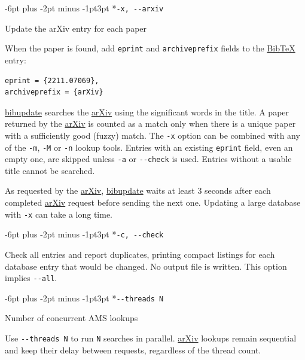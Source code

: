 \documentclass{amsart}
\makeatletter
\newcommand{\BibUpdateOptionHeading}{\@startsection{paragraph}{4}{0pt}
  {-6pt plus -2pt minus -1pt}{3pt}
  {\normalfont\bfseries\color{NavyBlue}}}
\newenvironment{BibUpdateOptionDescription}
  {\begin{list}{}{\setlength{\leftmargin}{2em}\setlength{\rightmargin}{0pt}%
    \setlength{\listparindent}{0pt}%
    \setlength{\topsep}{0pt}\setlength{\parsep}{4pt plus 1pt}%
    \setlength{\itemsep}{0pt}}\item\relax}
  {\end{list}}
\makeatother
\begin{document}
\BibUpdateOptionHeading*{\texorpdfstring{\texttt{-x,\ -\/-arxiv}}{-x, -\/-arxiv}}\label{-x---arxiv}

\begin{BibUpdateOptionDescription}

Update the arXiv entry for each paper

When the paper is found, add \texttt{eprint} and \texttt{archiveprefix}
fields to the \href{http://www.bibtex.org/}{BibTeX} entry:

\begin{Verbatim}[breaklines=true,fontsize=\small]
eprint = {2211.07069},
archiveprefix = {arXiv}
\end{Verbatim}

\href{https://github.com/AndrewMathas/BibUpdate}{bibupdate} searches the
\href{http://arxiv.org/}{arXiv} using the significant words in the
title. A paper returned by the \href{http://arxiv.org/}{arXiv} is
counted as a match only when there is a unique paper with a sufficiently
good (fuzzy) match. The \texttt{-x} option can be combined with any of
the \texttt{-m}, \texttt{-M} or \texttt{-n} lookup tools. Entries with
an existing \texttt{eprint} field, even an empty one, are skipped unless
\texttt{-a} or \texttt{-\/-check} is used. Entries without a usable
title cannot be searched.

As requested by the \href{http://arxiv.org/}{arXiv},
\href{https://github.com/AndrewMathas/BibUpdate}{bibupdate} waits at
least 3 seconds after each completed \href{http://arxiv.org/}{arXiv}
request before sending the next one. Updating a large database with
\texttt{-x} can take a long time.

\end{BibUpdateOptionDescription}

\BibUpdateOptionHeading*{\texorpdfstring{\texttt{-c,\ -\/-check}}{-c, -\/-check}}\label{-c---check}

\begin{BibUpdateOptionDescription}

Check all entries and report duplicates, printing compact listings for
each database entry that would be changed. No output file is written.
This option implies \texttt{-\/-all}.

\end{BibUpdateOptionDescription}

\BibUpdateOptionHeading*{\texorpdfstring{\texttt{-\/-threads\ N}}{-\/-threads N}}\label{--threads-n}

\begin{BibUpdateOptionDescription}

Number of concurrent AMS lookups

Use \texttt{-\/-threads\ N} to run \texttt{N} searches in parallel.
\href{http://arxiv.org/}{arXiv} lookups remain sequential and keep their
delay between requests, regardless of the thread count.

\end{BibUpdateOptionDescription}
\end{document}
